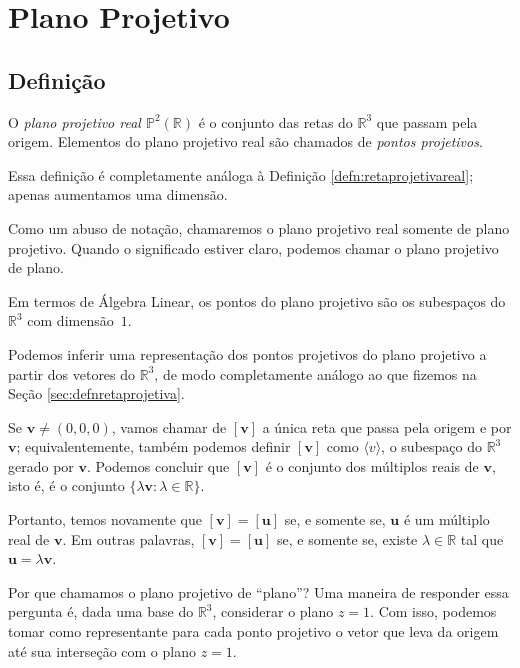 \chapter{Plano Projetivo}

\section{Definição}

\begin{defn} \label{defn:planoprojetivoreal}
O \emph{plano projetivo real \(\mathbb{P}^2(\mathbb{R})\)} é o conjunto das retas do \(\mathbb{R}^3\) que passam pela origem.
Elementos do plano projetivo real são chamados de \emph{pontos projetivos}.
\end{defn}

Essa definição é completamente análoga à Definição \ref{defn:retaprojetivareal}; apenas aumentamos uma dimensão.

Como um abuso de notação, chamaremos o plano projetivo real somente de plano projetivo.
Quando o significado estiver claro, podemos chamar o plano projetivo de plano.

Em termos de Álgebra Linear, os pontos do plano projetivo são os subespaços do \(\mathbb{R}^3\) com dimensão~\(1\).

Podemos inferir uma representação dos pontos projetivos do plano projetivo a partir dos vetores do \(\mathbb{R}^3\), de modo completamente análogo ao que fizemos na Seção \ref{sec:defnretaprojetiva}.

Se \(\mathbf{v} \neq (0, 0, 0)\), vamos chamar de \([\mathbf{v}]\) a única reta que passa pela origem e por \(\mathbf{v}\); equivalentemente, também podemos definir \([\mathbf{v}]\) como \(\langle v \rangle\), o subespaço do \(\mathbb{R}^3\) gerado por \(\mathbf{v}\).
Podemos concluir que \([\mathbf{v}]\) é o conjunto dos múltiplos reais de \(\mathbf{v}\), isto é, é o conjunto \(\{ \lambda \mathbf{v} : \lambda \in \mathbb{R}\}\).

Portanto, temos novamente que \([\mathbf{v}] = [\mathbf{u}]\) se, e somente se, \(\mathbf{u}\) é um múltiplo real de \(\mathbf{v}\).
Em outras palavras, \([\mathbf{v}] = [\mathbf{u}]\) se, e somente se, existe \(\lambda \in \mathbb{R}\) tal que \(\mathbf{u} = \lambda\mathbf{v}\).

Por que chamamos o plano projetivo de ``plano''? Uma maneira de responder essa pergunta é, dada uma base do $\mathbb{R}^3$, considerar o plano $z=1$.
Com isso, podemos tomar como representante para cada ponto projetivo o vetor que leva da origem até sua interseção com o plano $z=1$.

